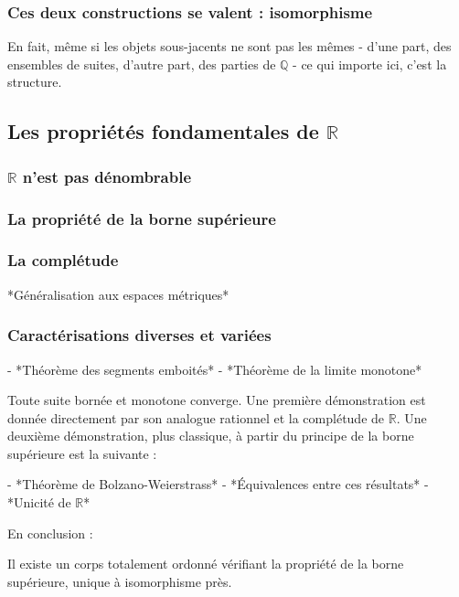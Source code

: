 \subsubsection{Ces deux constructions se valent : isomorphisme}
En fait, même si les objets sous-jacents ne sont pas les mêmes - d'une part, des ensembles de suites, d'autre part, des parties de $\mathbb{Q}$ - ce qui importe ici, c'est la structure.

\subsection{Les propriétés fondamentales de $\mathbb{R}$}
\subsubsection{$\mathbb{R}$ n'est pas dénombrable}
\subsubsection{La propriété de la borne supérieure}
\subsubsection{La complétude}
*Généralisation aux espaces métriques*
\subsubsection{Caractérisations diverses et variées}
- *Théorème des segments emboités*
- *Théorème de la limite monotone*
\begin{theoreme}
    Toute suite bornée et monotone converge.
    \tcblower
    Une première démonstration est donnée directement par son analogue rationnel et la complétude de $\mathbb{R}$.
    Une deuxième démonstration, plus classique, à partir du principe de la borne supérieure est la suivante :
\end{theoreme}    
- *Théorème de Bolzano-Weierstrass*
- *Équivalences entre ces résultats*
- *Unicité de $\mathbb{R}$*

En conclusion :
\begin{theoreme}
    Il existe un corps totalement ordonné vérifiant la propriété de la borne supérieure, unique à isomorphisme près.    
\end{theoreme}

